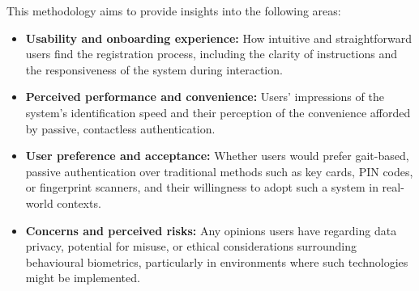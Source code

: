 This methodology aims to provide insights into the following areas:

\begin{itemize}
    \item \textbf{Usability and onboarding experience:} How intuitive and straightforward users find the registration process, including the clarity of instructions and the responsiveness of the system during interaction.

    \item \textbf{Perceived performance and convenience:} Users' impressions of the system's identification speed and their perception of the convenience afforded by passive, contactless authentication.

    \item \textbf{User preference and acceptance:} Whether users would prefer gait-based, passive authentication over traditional methods such as key cards, PIN codes, or fingerprint scanners, and their willingness to adopt such a system in real-world contexts.

    \item \textbf{Concerns and perceived risks:} Any opinions users have regarding data privacy, potential for misuse, or ethical considerations surrounding behavioural biometrics, particularly in environments where such technologies might be implemented.
\end{itemize}

